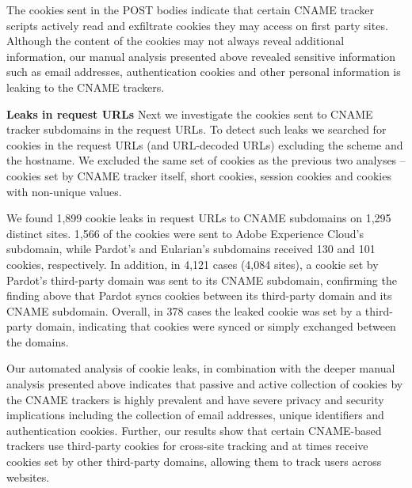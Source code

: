 The cookies sent in the POST bodies indicate that certain CNAME tracker scripts actively read and exfiltrate cookies they may access on first party sites.
Although the content of the cookies may not always reveal additional information, our manual analysis presented above revealed sensitive information such as email addresses, authentication cookies and other personal information is leaking to the CNAME trackers.

\textbf{Leaks in request URLs}
Next we investigate the cookies sent to CNAME tracker subdomains in the request URLs.
To detect such leaks we searched for cookies in the request URLs (and URL-decoded URLs) excluding the scheme and the hostname.
We excluded the same set of cookies as the previous two analyses -- cookies set by CNAME tracker itself, short cookies,  session cookies and cookies with non-unique values.

We found 1,899 cookie leaks in request URLs to CNAME subdomains on 1,295 distinct sites. 
1,566 of the cookies were sent to Adobe Experience Cloud's subdomain, while Pardot's and Eularian's subdomains received 130 and 101 cookies, respectively.
In addition, in 4,121 cases (4,084 sites), a cookie set by Pardot's third-party domain was sent to its CNAME subdomain, confirming the finding above that Pardot syncs cookies between its third-party domain and its CNAME subdomain.
Overall, in 378 cases the leaked cookie was set by a third-party domain, indicating that cookies were synced or simply exchanged between the domains.

Our automated analysis of cookie leaks, in combination with the deeper manual analysis presented above indicates that passive and active collection of cookies by the CNAME trackers is highly prevalent and have severe privacy and security implications including the collection of email addresses, unique identifiers and authentication cookies.
Further, our results show that certain CNAME-based trackers use third-party cookies for cross-site tracking and at times receive cookies set by other third-party domains, allowing them to track users across websites.



